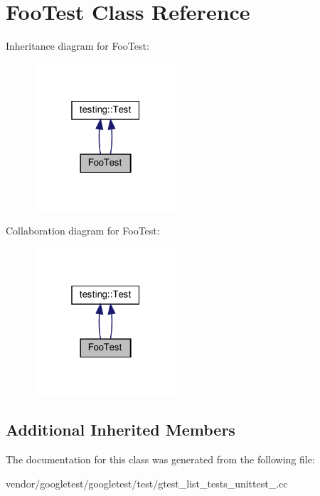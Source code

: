 \hypertarget{class_foo_test}{}\section{Foo\+Test Class Reference}
\label{class_foo_test}


Inheritance diagram for Foo\+Test\+:
\nopagebreak
\begin{figure}[H]
\begin{center}
\leavevmode
\includegraphics[width=151pt]{class_foo_test__inherit__graph}
\end{center}
\end{figure}


Collaboration diagram for Foo\+Test\+:
\nopagebreak
\begin{figure}[H]
\begin{center}
\leavevmode
\includegraphics[width=151pt]{class_foo_test__coll__graph}
\end{center}
\end{figure}
\subsection*{Additional Inherited Members}


The documentation for this class was generated from the following file\+:\begin{DoxyCompactItemize}
\item 
vendor/googletest/googletest/test/gtest\+\_\+list\+\_\+tests\+\_\+unittest\+\_\+.\+cc\end{DoxyCompactItemize}

